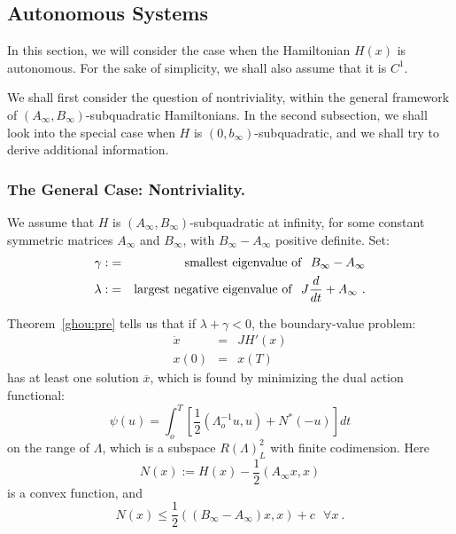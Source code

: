 \documentclass{svproc}
\begin{document}
%
\subsection{Autonomous Systems}
%
In this section, we will consider the case when the Hamiltonian $H(x)$
is autonomous. For the sake of simplicity, we shall also assume that it
is $C^{1}$.

We shall first consider the question of nontriviality, within the
general framework of
$\left(A_{\infty},B_{\infty}\right)$-subquadratic Hamiltonians. In
the second subsection, we shall look into the special case when $H$ is
$\left(0,b_{\infty}\right)$-subquadratic,
and we shall try to derive additional information.
%
\subsubsection{The General Case: Nontriviality.}
%
We assume that $H$ is
$\left(A_{\infty},B_{\infty}\right)$-sub\-qua\-dra\-tic at infinity,
for some constant symmetric matrices $A_{\infty}$ and $B_{\infty}$,
with $B_{\infty}-A_{\infty}$ positive definite. Set:
\begin{eqnarray}
\gamma :&=&{\rm smallest\ eigenvalue\ of}\ \ B_{\infty} - A_{\infty} \\
  \lambda : &=& {\rm largest\ negative\ eigenvalue\ of}\ \
  J \frac{d}{dt} +A_{\infty}\ .
\end{eqnarray}

Theorem~\ref{ghou:pre} tells us that if $\lambda +\gamma < 0$, the
boundary-value problem:
\begin{equation}
\begin{array}{rcl}
  \dot{x}&=&JH' (x)\\
  x(0)&=&x (T)
\end{array}
\end{equation}
has at least one solution
$\overline{x}$, which is found by minimizing the dual
action functional:
\begin{equation}
  \psi (u) = \int_{o}^{T} \left[\frac{1}{2}
  \left(\Lambda_{o}^{-1} u,u\right) + N^{\ast} (-u)\right] dt
\end{equation}
on the range of $\Lambda$, which is a subspace $R (\Lambda)_{L}^{2}$
with finite codimension. Here
\begin{equation}
  N(x) := H(x) - \frac{1}{2} \left(A_{\infty} x,x\right)
\end{equation}
is a convex function, and
\begin{equation}
  N(x) \le \frac{1}{2}
  \left(\left(B_{\infty} - A_{\infty}\right) x,x\right)
  + c\ \ \ \forall x\ .
\end{equation}
\end{document}
